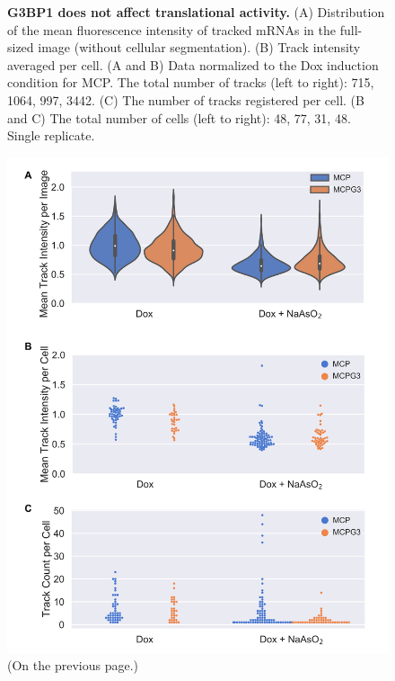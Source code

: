 \vspace*{\fill}
\begin{figure}[b!]
    \centering
    \caption{\textbf{G3BP1 does not affect translational activity.}
        (A) Distribution of the mean fluorescence intensity of tracked
            mRNAs in the full-sized image (without cellular segmentation).
        (B) Track intensity averaged per cell.
        (A and B) Data normalized to the Dox induction condition for MCP.
            The total number of tracks (left to right): 715, 1064, 997, 3442.
        (C) The number of tracks registered per cell.
        (B and C) The total number of cells (left to right): 48, 77, 31, 48. Single replicate.
    }
    \end{figure}
    \addtocounter{figure}{-1}
    \begin{figure} [H]
    \includegraphics[width=\linewidth]{images/figure4}
    \caption{(On the previous page.)}
    \label{fig:mcp_suntag}
\end{figure}


